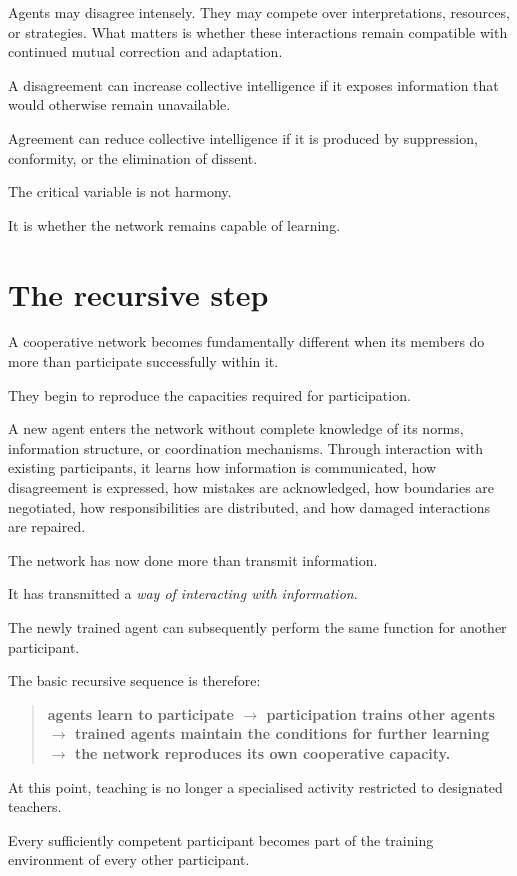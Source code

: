 \documentclass[11pt, a4paper]{article}
\begin{document}
Agents may disagree intensely. They may compete over interpretations, resources, or strategies. What matters is whether these interactions remain compatible with continued mutual correction and adaptation.

A disagreement can increase collective intelligence if it exposes information that would otherwise remain unavailable.

Agreement can reduce collective intelligence if it is produced by suppression, conformity, or the elimination of dissent.

The critical variable is not harmony.

It is whether the network remains capable of learning.

\section{The recursive step}
A cooperative network becomes fundamentally different when its members do more than participate successfully within it.

They begin to reproduce the capacities required for participation.

A new agent enters the network without complete knowledge of its norms, information structure, or coordination mechanisms. Through interaction with existing participants, it learns how information is communicated, how disagreement is expressed, how mistakes are acknowledged, how boundaries are negotiated, how responsibilities are distributed, and how damaged interactions are repaired.

The network has now done more than transmit information.

It has transmitted a \emph{way of interacting with information}.

The newly trained agent can subsequently perform the same function for another participant.

The basic recursive sequence is therefore:

\begin{quote}
    \textbf{agents learn to participate $\rightarrow$ participation trains other agents $\rightarrow$ trained agents maintain the conditions for further learning $\rightarrow$ the network reproduces its own cooperative capacity.}
\end{quote}

At this point, teaching is no longer a specialised activity restricted to designated teachers.

Every sufficiently competent participant becomes part of the training environment of every other participant.
\end{document}
